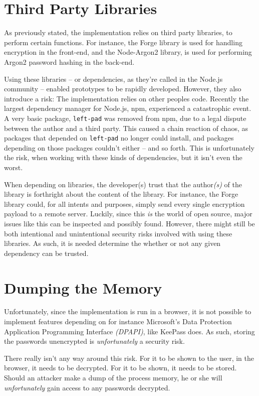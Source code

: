 	\section{Third Party Libraries}
		As previously stated, the implementation relies on third party libraries, to perform certain functions. For instance, the Forge library is used for handling encryption in the front-end, and the Node-Argon2 library, is used for performing Argon2 password hashing in the back-end. 

		Using these libraries -- or dependencies, as they're called in the Node.js community -- enabled prototypes to be rapidly developed. However, they also introduce a risk: The implementation relies on other peoples code. Recently the largest dependency manager for Node.js, npm, experienced a catastrophic event. A very basic package, \verb=left-pad= was removed from npm, due to a legal dispute between the author and a third party\cite{npm_leftpad}. This caused a chain reaction of chaos, as packages that depended on \verb=left-pad= no longer could install, and packages depending on those packages couldn't either -- and so forth. This is unfortunately the risk, when working with these kinds of dependencies, but it isn't even the worst.

		When depending on libraries, the developer(s) trust that the author\emph{(s)} of the library is forthright about the content of the library. For instance, the Forge library could, for all intents and purposes, simply send every single encryption payload to a remote server. Luckily, since this \emph{is} the world of open source, major issues like this can be inspected and possibly found. However, there might still be both intentional and unintentional security risks involved with using these libraries. As such, it is needed determine the whether or not any given dependency can be trusted.



	\section{Dumping the Memory}
		Unfortunately, since the implementation is run in a browser, it is not possible to implement features depending on for instance Microsoft's Data Protection Application Programming Interface \emph{(DPAPI)}, like KeePass does. As such, storing the passwords unencrypted is \emph{unfortunately} a security risk.

		There really isn't any way around this risk. For it to be shown to the user, in the browser, it needs to be decrypted. For it to be shown, it needs to be stored. Should an attacker make a dump of the process memory, he or she will \emph{unfortunately} gain access to any passwords decrypted. 

